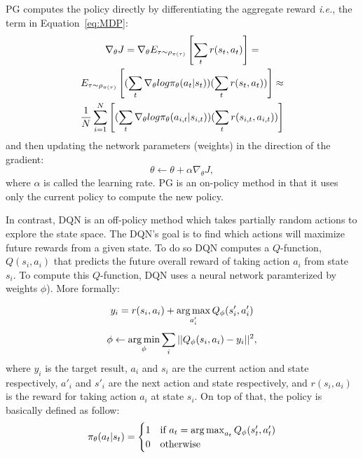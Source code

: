 PG computes the policy directly by differentiating the aggregate reward \textit{i.e.}, the term in Equation~\ref{eq:MDP}:
\begin{multline}
\label{eq:policygradient}
    \nabla_\theta J =  \nabla_\theta E_{\tau{\raise.05ex\hbox{$\scriptstyle\mathtt{\sim}$}}\rho_{\pi(\tau)}} \left[\sum_{t}^{}r(s_t,a_t) \right] = \\
    E_{\tau{\raise.05ex\hbox{$\scriptstyle\mathtt{\sim}$}}\rho_{\pi(\tau)}} \left[(\sum_{t}^{}\nabla_\theta log\pi_\theta(a_t|s_t))(\sum_{t}^{}r(s_t,a_t))\right] \approx \\
    \frac{1}{N}\sum_{i=1}^{N} \left[ (\sum_{t}^{}\nabla_\theta log\pi_\theta(a_{i,t}|s_{i,t}))(\sum_{t}^{}r(s_{i,t},a_{i,t})) \right]
\end{multline}
and then updating the network parameters (weights) in the direction of the gradient:
\begin{equation}
    \theta \leftarrow \theta+\alpha\nabla_\theta J,
\end{equation}
where $\alpha$ is called the learning rate. PG is an on-policy method in that it uses only the current policy to compute the new policy.

In contrast, DQN is an off-policy method which takes partially random actions to explore the state space. The DQN's goal is to find which actions will maximize future rewards from a given state. To do so DQN computes a $Q$-function, $Q(s_i, a_i)$ that predicts the future overall reward of taking action $a_i$ from state $s_i$. To compute this $Q$-function, DQN uses a neural network paramterized by weights $\phi$). More formally:

\begin{equation}
\label{eq:Dqn}
    y_i = r(s_i,a_i) + \operatorname*{arg\,max}_{a'_i}Q_\phi(s'_i,a'_i)\\
\end{equation}
\begin{equation}
    \phi \leftarrow \operatorname*{arg\,min}_{\phi}\sum_i||Q_\phi(s_i,a_i)-y_i||^2,
\end{equation}
\noindent
where $y_i$ is the target result, $a_i$ and $s_i$ are the current action and state respectively, $a'_i$ and $s'_i$ are the next action and state respectively, and $r(s_i,a_i)$ is the reward for taking action $a_i$ at state $s_i$. On top of that, the policy is basically defined as follow:
\begin{equation}
    \pi_\theta(a_t|s_t) =
    \begin{cases}
    1 & \text{if } a_t =\operatorname*{arg\,max}_{a_t}Q_\phi(s'_t,a'_t)\\
    0              & \text{otherwise}
\end{cases}
\end{equation}
